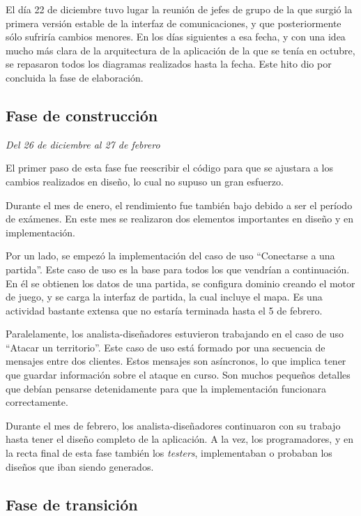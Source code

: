 El día 22 de diciembre tuvo lugar la reunión de jefes de grupo de la que surgió
la primera versión estable de la interfaz de comunicaciones, y que
posteriormente sólo sufriría cambios menores. En los días siguientes a esa
fecha, y con una idea mucho más clara de la arquitectura de la aplicación de la
que se tenía en octubre, se repasaron todos los diagramas realizados hasta la
fecha. Este hito dio por concluida la fase de elaboración.

\subsection{Fase de construcción}

\textit{Del 26 de diciembre al 27 de febrero}

El primer paso de esta fase fue reescribir el código para que se ajustara a los
cambios realizados en diseño, lo cual no supuso un gran esfuerzo.

Durante el mes de enero, el rendimiento fue también bajo debido a ser el
período de exámenes. En este mes se realizaron dos elementos importantes en
diseño y en implementación.

Por un lado, se empezó la implementación del caso de uso ``Conectarse a una
partida''. Este caso de uso es la base para todos los que vendrían a
continuación. En él se obtienen los datos de una partida, se configura dominio
creando el motor de juego, y se carga la interfaz de partida, la cual incluye
el mapa. Es una actividad bastante extensa que no estaría terminada hasta el 5
de febrero.

Paralelamente, los analista-diseñadores estuvieron trabajando en el caso de uso
``Atacar un territorio''. Este caso de uso está formado por una secuencia de
mensajes entre dos clientes. Estos mensajes son asíncronos, lo que implica
tener que guardar información sobre el ataque en curso. Son muchos pequeños
detalles que debían pensarse detenidamente para que la implementación
funcionara correctamente.

Durante el mes de febrero, los analista-diseñadores continuaron con su trabajo
hasta tener el diseño completo de la aplicación. A la vez, los programadores, y
en la recta final de esta fase también los \textit{testers}, implementaban o
probaban los diseños que iban siendo generados.

\subsection{Fase de transición}

